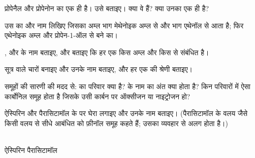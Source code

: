 \begin{exercise}[$\star\star$]\label{exo:g11:functional-groups:7}
प्रोपेनैल और प्रोपेनोन का  एक ही है। उसे बताइए। क्या
वे  हैं? क्या उनका  एक ही है?
\end{exercise}

\begin{exercise}[$\star\star$]\label{exo:g11:functional-groups:8}
उस  का  और नाम लिखिए जिसका अम्ल भाग
मेथेनोइक अम्ल  से और  भाग एथेनॉल से आता है; फिर
एथेनोइक अम्ल और प्रोपेन-1-ऑल से बने  का।
\end{exercise}

\begin{exercise}[$\star\star$]\label{exo:g11:functional-groups:9}
 ,  और
 के नाम बताइए, और बताइए कि हर एक किस अम्ल और किस  से संबंधित है।
\end{exercise}

\begin{exercise}[$\star\star$]\label{exo:g11:functional-groups:10}
सूत्र  वाले चारों  बनाइए और उनके नाम बताइए, और हर एक की
श्रेणी बताइए।
\end{exercise}

\begin{exercise}[$\star\star$]\label{exo:g11:functional-groups:11}
समूहों की सारणी की मदद से:  का परिवार क्या है?  के
नाम का अंत क्या होता है? किन परिवारों में ऐसा कार्बोनिल समूह होता है जिसके उसी
कार्बन पर ऑक्सीजन या नाइट्रोजन  हो?
\end{exercise}

\begin{exercise}[$\star\star\star$]\label{exo:g11:functional-groups:12}
ऐस्पिरिन और पैरासिटामॉल के  पर घेरा लगाइए और उनके नाम बताइए।
(पैरासिटामॉल के वलय जैसे किसी वलय से सीधे आबंधित  को
फ़ीनॉल समूह कहते हैं; उसका व्यवहार  से अलग होता है।)
\begin{center}
\qquad
{}
\\[2pt] \small ऐस्पिरिन \hspace{4.2cm} पैरासिटामॉल
\end{center}
\end{exercise}

